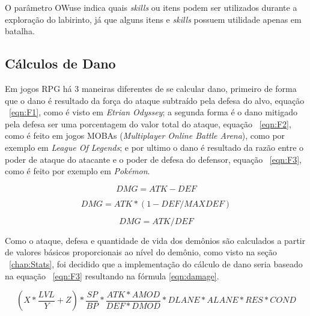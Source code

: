 	O parâmetro OWuse indica quais \emph{skills} ou itens podem ser utilizados durante a exploração do labirinto, já que alguns itens e \emph{skills} possuem utilidade apenas em batalha.

\subsection{Cálculos de Dano}

	Em jogos RPG há 3 maneiras diferentes de se calcular dano, primeiro de forma que o dano é resultado da força do ataque subtraído pela defesa do alvo, equação ~\ref{eqn:F1}, como é visto em \emph{Etrian Odyssey}; a segunda forma é o dano mitigado pela defesa ser uma porcentagem do valor total do ataque, equação ~\ref{eqn:F2}, como é feito em jogos MOBAs (\emph{Multiplayer Online Battle Arena}), como por exemplo em \emph{League Of Legends}; e por ultimo o dano é resultado da razão entre o poder de ataque do atacante e o poder de defesa do defensor, equação ~\ref{eqn:F3}, como é feito por exemplo em \emph{Pokémon}.
	
\begin{equation}
\label{eqn:F1}
DMG = ATK - DEF
\end{equation}

\begin{equation}
\label{eqn:F2}
DMG = ATK * (1 - DEF/MAXDEF)
\end{equation}

\begin{equation}
\label{eqn:F3}
DMG = ATK / DEF
\end{equation}

	Como o ataque, defesa e quantidade de vida dos demônios são calculados a partir de valores básicos proporcionais ao nível do demônio, como visto na seção ~\ref{chap:Stats}, foi decidido que a implementação do cálculo de dano seria baseado na equação ~\ref{eqn:F3} resultando na fórmula \ref{eqn:damage}.

\begin{equation}
\label{eqn:damage}
(X*\frac{LVL}{Y} + Z) * \frac{SP}{BP} * \frac{ATK*AMOD}{DEF*DMOD} * DLANE * ALANE * RES * COND
\end{equation}

